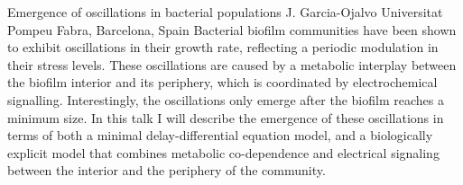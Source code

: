 
    \begin{abstract_online}{Emergence of oscillations in bacterial populations}{%
        J. Garcia-Ojalvo}{%
        \IStag}{%
        Universitat Pompeu Fabra, Barcelona, Spain}
    Bacterial biofilm communities have been shown to exhibit oscillations in their growth rate, reflecting a periodic modulation in their stress levels. These oscillations are caused by a metabolic interplay between the biofilm interior and its periphery, which is coordinated by electrochemical signalling. Interestingly, the oscillations only emerge after the biofilm reaches a minimum size. In this talk I will describe the emergence of these oscillations in terms of both a minimal delay-differential equation model, and a biologically explicit model that combines metabolic co-dependence and electrical signaling between the interior and the periphery of the community. 
    
    \end{abstract_online}
    